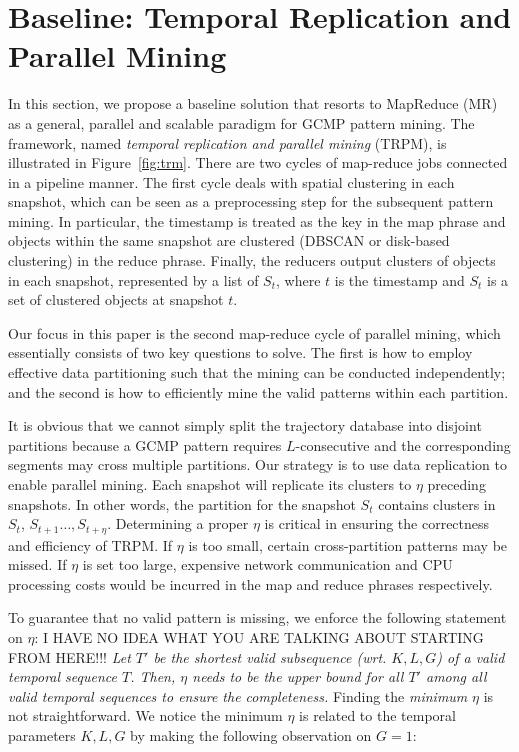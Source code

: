 
\section{Baseline: Temporal Replication and Parallel Mining}
\label{sec:trm}
In this section, we propose a baseline solution that resorts to MapReduce (MR) as a general, parallel and scalable paradigm for GCMP pattern mining. The framework, named \textit{temporal replication and parallel mining} (TRPM), is illustrated in   Figure~\ref{fig:trm}. There are two cycles of map-reduce jobs connected in a pipeline manner. The first cycle deals with spatial clustering in each snapshot, which can be seen as a preprocessing step for the subsequent pattern mining. In particular, the timestamp is treated as the key in the map phrase and objects within the same snapshot are clustered (DBSCAN or disk-based clustering) in the reduce phrase. Finally, the reducers output clusters of objects in each snapshot, represented by a list of $S_t$, where $t$ is the timestamp and $S_t$ is a set of clustered objects at snapshot $t$. 

Our focus in this paper is the second map-reduce cycle of parallel mining, which essentially consists of two key questions to solve. The first is how to employ effective data partitioning such that the mining can be conducted independently; and the second is how to efficiently mine the valid patterns within each partition. 


It is obvious that we cannot simply split the trajectory database into disjoint partitions because a GCMP pattern requires $L$-consecutive and the corresponding segments may cross multiple partitions. Our strategy is to use data replication to enable parallel mining. Each snapshot will replicate its clusters to $\eta$ preceding snapshots. In other words, the partition for the snapshot $S_t$ contains clusters in $S_t$, $S_{t+1}\ldots,S_{t+\eta}$. Determining a proper $\eta$ is critical in ensuring the
correctness and efficiency of TRPM. If $\eta$ is too small, certain cross-partition patterns may be missed. If $\eta$ is set too large, expensive network communication and CPU processing costs would be incurred in the map and reduce phrases respectively. 

To guarantee that no valid pattern is missing, we enforce the
following statement on $\eta$:
I HAVE NO IDEA WHAT YOU ARE TALKING ABOUT STARTING FROM HERE!!!
 \emph{Let $T'$ be the \emph{shortest} 
valid subsequence (wrt. $K,L,G$) of a valid temporal sequence $T$. 
Then, $\eta$ needs to be the upper bound for all $T'$ among all valid temporal sequences to ensure the completeness.} 
Finding the \emph{minimum} $\eta$ is not
straightforward. We notice the minimum $\eta$ is related to the temporal
parameters $K,L,G$ by making the following observation on $G=1$:



